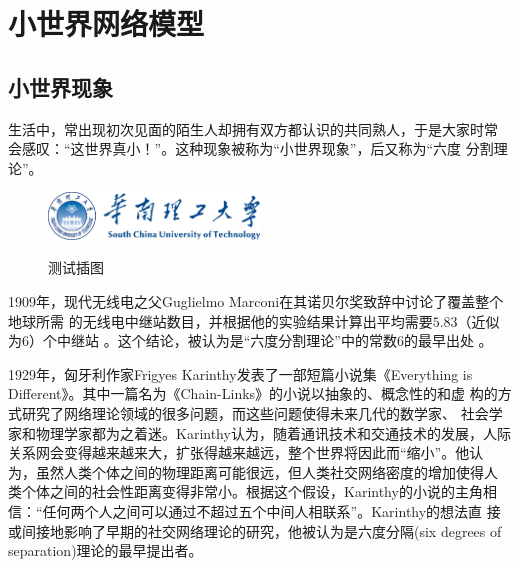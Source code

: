 \documentclass[phd,nobackinfo]{scutthesis}
\begin{document}
\chapter{小世界网络模型}\label{chapter_smallworld}
\section{小世界现象}

生活中，常出现初次见面的陌生人却拥有双方都认识的共同熟人，于是大家时常
会感叹：“这世界真小！”。这种现象被称为``小世界现象''，后又称为``六度
分割理论''。

\begin{figure}[htbp]
  \centering
  \includegraphics[width= 0.5\textwidth]{scutlogo.eps}\\
  \caption{测试插图}\label{fig:test2}
\end{figure}

1909年，现代无线电之父Guglielmo Marconi在其诺贝尔奖致辞中讨论了覆盖整个地球所需
的无线电中继站数目，并根据他的实验结果计算出平均需要$5.83$（近似为$6$）个中继站
\cite{marconi1909nobel}。这个结论，被认为是``六度分割理论''中的常数$6$的最早出处
\cite{barabasi2003linked}。

1929年，匈牙利作家Frigyes Karinthy发表了一部短篇小说集《Everything is
  Different》。其中一篇名为《Chain-Links》的小说以抽象的、概念性的和虚
构的方式研究了网络理论领域的很多问题，而这些问题使得未来几代的数学家、
社会学家和物理学家都为之着迷\cite{newman2006structure,
  barabasi2003linked}。Karinthy认为，随着通讯技术和交通技术的发展，人际
关系网会变得越来越来大，扩张得越来越远，整个世界将因此而``缩小''。他认
为，虽然人类个体之间的物理距离可能很远，但人类社交网络密度的增加使得人
类个体之间的社会性距离变得非常小。根据这个假设，Karinthy的小说的主角相
信：``任何两个人之间可以通过不超过五个中间人相联系''。Karinthy的想法直
接或间接地影响了早期的社交网络理论的研究，他被认为是六度分隔(six
degrees of separation)理论的最早提出者\cite{barabasi2003linked}。
\end{document}

